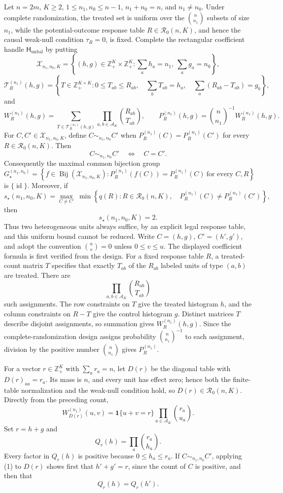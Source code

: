 Let \(n=2m\), \(K\geq 2\), \(1\leq n_1,n_0\leq n-1\), \(n_1+n_0=n\), and \(n_1\neq n_0\). Under complete randomization, the treated set is uniform over the \(\binom n{n_1}\) subsets of size \(n_1\), while the potential-outcome response table \(R\in\mathcal R_0(n,K)\), and hence the causal weak-null condition \(\tau_R=0\), is fixed. Complete the rectangular coefficient handle \(\mathsf H_{\mathrm{unbal}}\) by putting
\[
 \mathcal X_{n_1,n_0,K}
 =\left\{(h,g)\in\mathbb Z_+^K\times\mathbb Z_+^K:
       \sum_a h_a=n_1,\ \sum_a g_a=n_0\right\},
\]
\[
 \mathcal T_R^{(n_1)}(h,g)
 =\left\{T\in\mathbb Z_+^{K\times K}:0\leq T_{ab}\leq R_{ab},\quad
       \sum_bT_{ab}=h_a,\quad \sum_a(R_{ab}-T_{ab})=g_b\right\},
\]
and
\[
 W_R^{(n_1)}(h,g)
 =\sum_{T\in\mathcal T_R^{(n_1)}(h,g)}
       \prod_{a,b\in\mathcal A_K}\binom{R_{ab}}{T_{ab}},
 \qquad
 P_R^{(n_1)}(h,g)=\binom n{n_1}^{-1}W_R^{(n_1)}(h,g).
\]
For \(C,C'\in\mathcal X_{n_1,n_0,K}\), define \(C\sim_{n_1,n_0}C'\) when \(P_R^{(n_1)}(C)=P_R^{(n_1)}(C')\) for every \(R\in\mathcal R_0(n,K)\). Then
\[
 C\sim_{n_1,n_0}C'\quad\Longleftrightarrow\quad C=C'.
\]
Consequently the maximal common bijection group
\[
 G_\star^{(n_1,n_0)}
 =\left\{f\in\operatorname{Bij}(\mathcal X_{n_1,n_0,K}):
 P_R^{(n_1)}(f(C))=P_R^{(n_1)}(C)\ \text{for every }C,R\right\}
\]
is \(\{\operatorname{id}\}\). Moreover, if
\[
 s_\star(n_1,n_0,K)
 =\max_{C\neq C'}\ \min\left\{q(R):R\in\mathcal R_0(n,K),\quad
       P_R^{(n_1)}(C)\neq P_R^{(n_1)}(C')\right\},
\]
then
\[
 s_\star(n_1,n_0,K)=2.
\]
Thus two heterogeneous units always suffice, by an explicit legal response table, and this uniform bound cannot be reduced.
Write \(C=(h,g)\), \(C'=(h',g')\), and adopt the convention \(\binom uv=0\) unless \(0\leq v\leq u\). The displayed coefficient formula is first verified from the design. For a fixed response table \(R\), a treated-count matrix \(T\) specifies that exactly \(T_{ab}\) of the \(R_{ab}\) labeled units of type \((a,b)\) are treated. There are
\[
 \prod_{a,b\in\mathcal A_K}\binom{R_{ab}}{T_{ab}}
\]
such assignments. The row constraints on \(T\) give the treated histogram \(h\), and the column constraints on \(R-T\) give the control histogram \(g\). Distinct matrices \(T\) describe disjoint assignments, so summation gives \(W_R^{(n_1)}(h,g)\). Since the complete-randomization design assigns probability \(\binom n{n_1}^{-1}\) to each assignment, division by the positive number \(\binom n{n_1}\) gives \(P_R^{(n_1)}\).

For a vector \(r\in\mathbb Z_+^K\) with \(\sum_a r_a=n\), let \(D(r)\) be the diagonal table with \(D(r)_{aa}=r_a\). Its mass is \(n\), and every unit has effect zero; hence both the finite-table normalization and the weak-null condition hold, so \(D(r)\in\mathcal R_0(n,K)\). Directly from the preceding count,
\[
 W_{D(r)}^{(n_1)}(u,v)
 =\mathbf 1\{u+v=r\}\prod_{a\in\mathcal A_K}\binom{r_a}{u_a}.
 \tag{1}
\]
Set \(r=h+g\) and
\[
 Q_r(h)=\prod_a\binom{r_a}{h_a}.
\]
Every factor in \(Q_r(h)\) is positive because \(0\leq h_a\leq r_a\). If \(C\sim_{n_1,n_0}C'\), applying (1) to \(D(r)\) shows first that \(h'+g'=r\), since the count of \(C\) is positive, and then that
\[
 Q_r(h)=Q_r(h').
 \tag{2}
\]

